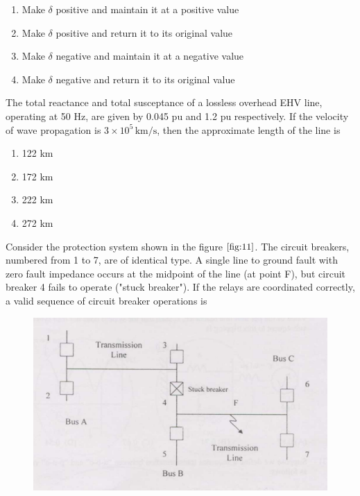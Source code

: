    \begin{multicols}{2}
   \begin{enumerate}
        \item Make $\delta$ positive and maintain it at a positive value
        \item Make $\delta$ positive and return it to its original value
        \item Make $\delta$ negative and maintain it at a negative value
        \item Make $\delta$ negative and return it to its original value
    \end{enumerate}
    \end{multicols}
    \bigskip
    \item The total reactance and total susceptance of a lossless overhead EHV line, operating at 50 Hz, are given by 0.045 pu and 1.2 pu respectively. If the velocity of wave propagation is $3 \times 10^5 \, \text{km/s}$, then the approximate length of the line is
    \begin{multicols}{4}
    \begin{enumerate}
        \item 122 km
        \item 172 km
        \item 222 km
        \item 272 km
    \end{enumerate}
    \end{multicols}
    \bigskip
    \item  Consider the protection system shown in the figure $\ref{fig:11}$. The circuit breakers, numbered from 1 to 7, are of identical type. A single line to ground fault with zero fault impedance occurs at the midpoint of the line (at point F), but circuit breaker 4 fails to operate ("stuck breaker"). If the relays are coordinated correctly, a valid sequence of circuit breaker operations is
    \begin{figure}[!ht]
    \centering
    \includegraphics[width=\linewidth]{GATE-yearwise/GATE(1)/figs/11.png}
    \caption{}
    \label{fig:11}
    \end{figure}
